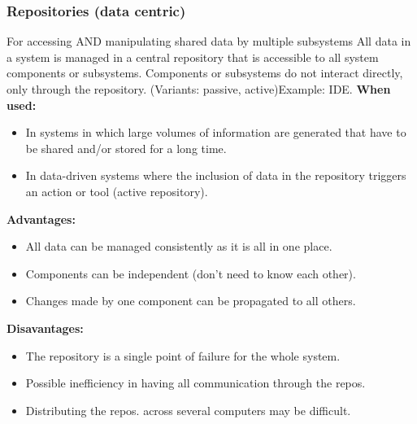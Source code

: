\documentclass[../ESOF_notes.tex]{subfiles}
\begin{document}
\subsubsection{Repositories (data centric)}
For accessing AND manipulating shared data by multiple subsystems\newline\newline
All data in a system is managed in a central repository that is accessible to all system components or subsystems. Components or subsystems do not interact directly, only through the repository. (Variants: passive, active)\newline Example: IDE. \newline\newline
\textbf{When used:}
\begin{itemize}
    \item In systems in which large volumes of information are generated that have to be shared and/or stored for a long time.
    \item In data-driven systems where the inclusion of data in the repository triggers an action or tool (active repository).
\end{itemize}
\textbf{Advantages:}
\begin{itemize}
    \item All data can be managed consistently as it is all in one place.
    \item Components can be independent (don’t need to know each other).
    \item Changes made by one component can be propagated to all others.
\end{itemize}
\textbf{Disavantages:}
\begin{itemize}
    \item The repository is a single point of failure for the whole system.
    \item Possible inefficiency in having all communication through the repos.
    \item Distributing the repos. across several computers may be difficult.
\end{itemize}
\end{document}
